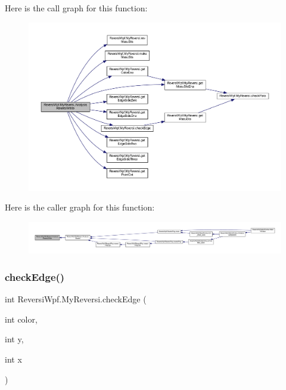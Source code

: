 Here is the call graph for this function\+:
\nopagebreak
\begin{figure}[H]
\begin{center}
\leavevmode
\includegraphics[width=350pt]{class_reversi_wpf_1_1_my_reversi_a7be281b0dbae11afb652260b4d30f128_cgraph}
\end{center}
\end{figure}
Here is the caller graph for this function\+:
\nopagebreak
\begin{figure}[H]
\begin{center}
\leavevmode
\includegraphics[width=350pt]{class_reversi_wpf_1_1_my_reversi_a7be281b0dbae11afb652260b4d30f128_icgraph}
\end{center}
\end{figure}
\mbox{\label{class_reversi_wpf_1_1_my_reversi_acad9426b5389a91f1f42c733b2f2097e}} 
\subsubsection{\texorpdfstring{check\+Edge()}{checkEdge()}}
{\footnotesize\ttfamily int Reversi\+Wpf.\+My\+Reversi.\+check\+Edge (\begin{DoxyParamCaption}\item[{int}]{color,  }\item[{int}]{y,  }\item[{int}]{x }\end{DoxyParamCaption})}



